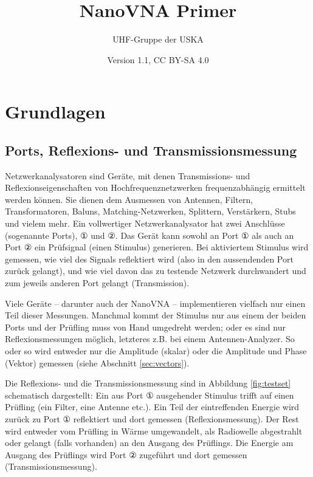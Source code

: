 \documentclass[twoside,a4paper,11pt,halfparskip,DIV=11,notitlepage]{scrartcl}
\title{NanoVNA Primer}
\author{\sf UHF-Gruppe der USKA}
\date{\sf Version 1.1, CC BY-SA 4.0 \ccbysa}
\begin{document}
\maketitle
\thispagestyle{empty}

\setcounter{tocdepth}{1}
\tableofcontents



\newpage


\section{Grundlagen}

\subsection{Ports, Reflexions- und Transmissionsmessung}\label{sec:ports}
Netzwerkanalysatoren sind Geräte, mit denen Transmissions- und
Reflexionseigenschaften von Hochfrequenznetzwerken frequenzabhängig ermittelt
werden können. Sie dienen dem Ausmessen von Antennen, Filtern, Transformatoren,
Baluns, Matching-Netzwerken, Splittern, Verstärkern, Stubs und vielem mehr. Ein
vollwertiger Netzwerkanalysator hat zwei Anschlüsse (sogenannte Ports), ① und ②.
Das Gerät kann sowohl an Port ① als auch an Port ② ein Prüfsignal (einen 
Stimulus) generieren. Bei aktiviertem Stimulus wird gemessen, wie viel des
Signals reflektiert wird (also in den aussendenden Port zurück gelangt), und
wie viel davon das zu testende Netzwerk durchwandert und zum jeweils anderen
Port gelangt (Transmission).

Viele Geräte -- darunter auch der NanoVNA -- implementieren vielfach nur einen Teil
dieser Messungen. Manchmal kommt der Stimulus nur aus einem der beiden Ports
und der Prüfling muss von Hand umgedreht werden; oder es sind nur
Reflexionsmessungen möglich, letzteres z.B. bei einem Antennen-Analyzer. So
oder so wird entweder nur die Amplitude (skalar) oder die Amplitude und Phase
(Vektor) gemessen (siehe Abschnitt \ref{sec:vectors}).

Die Reflexions- und die Transmissionsmessung sind in
Abbildung \ref{fig:testset} schematisch dargestellt: Ein aus Port ① ausgehender
Stimulus trifft auf einen Prüfling (ein Filter, eine Antenne etc.). Ein Teil
der eintreffenden Energie wird zurück zu Port ① reflektiert und dort gemessen
(Reflexionsmessung). Der Rest wird entweder vom Prüfling in Wärme umgewandelt,
als Radiowelle abgestrahlt oder gelangt (falls vorhanden) an den Ausgang des
Prüflings. Die Energie am Ausgang des Prüflings wird Port ② zugeführt
und dort gemessen (Transmissionsmessung).
\end{document}
